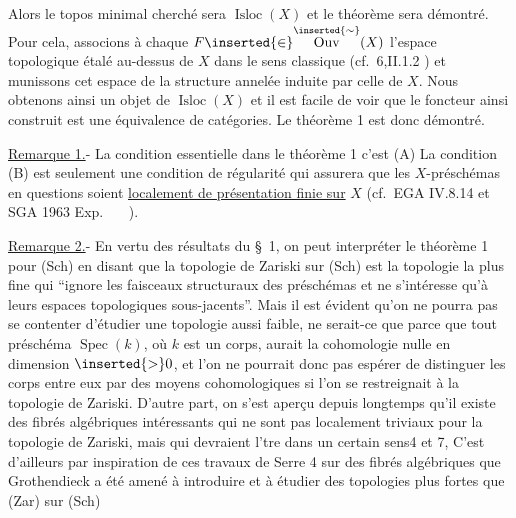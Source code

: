 
Alors le topos minimal cherché sera $\operatorname{Isloc}(X)$ et le théorème sera démontré. Pour cela, associons à chaque $F\inserted{\in}\overset{\inserted{\sim}}{\operatorname{Ouv}}(X)$ l'espace topologique étalé au-dessus de $X$ dans le sens classique (cf.\ \inserted{[}6\inserted{]},II.1.2 ) et munissons cet espace de la structure annelée induite par celle de $X$. Nous obtenons ainsi un objet de $\operatorname{Isloc}(X)$ et il est facile de voir que le foncteur ainsi construit est une équivalence de catégories. Le théorème 1 est donc démontré.

\uline{Remarque 1.}- La condition essentielle dans le théorème 1 c'est (A)
La condition (B) est seulement une condition de régularité qui assurera que les $X$-préschémas en questions soient \uline{localement de présentation finie sur} $X$ (cf.\ \inserted{[}EGA IV.8.14\inserted{]} et \inserted{[}SGA 1963 Exp.\ $\quad$\inserted{]} ).

\uline{Remarque 2.}- En vertu des résultats du \S\ 1, on peut interpréter le théorème 1 pour (Sch) en disant que la topologie de Zariski sur (Sch) est la topologie la plus fine qui ``ignore les faisceaux structuraux des préschémas et ne s'intéresse qu'à leurs espaces topologiques sous-jacents''. Mais il est évident qu'on ne pourra pas se contenter d'étudier une topologie aussi faible, ne serait-ce que parce que tout préschéma $\operatorname{Spec}(k)$, où $k$ est un corps, aurait la cohomologie nulle en dimension $\inserted{>}0$, et l'on ne pourrait donc pas espérer de distinguer les corps entre eux par des moyens cohomologiques si l'on se restreignait à la topologie de Zariski. D'autre part, on s'est aperçu depuis longtemps qu'il existe des fibrés algébriques intéressants qui ne sont pas localement triviaux pour la topologie de Zariski, mais qui devraient l'tre dans un certain sens\inserted{(voir [}4\inserted{]} et \inserted{[}7\inserted{])}, C'est d'ailleurs par inspiration de ces travaux de Serre \inserted{[}4\inserted{]} sur des fibrés algébriques que Grothendieck a été amené à introduire et à étudier des topologies plus fortes que (Zar) sur (Sch)
